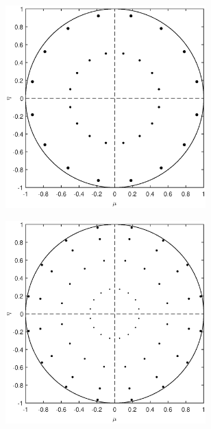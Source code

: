 \begin{figure}
\begin{subfigure}[b]{0.46\textwidth}
		\caption{}
	\end{subfigure}
	\vfill
	\begin{subfigure}[b]{0.46\textwidth}
		\centering
		\includegraphics[width=0.85\textwidth]{figures/sec_Sn/PGLC4_2_2D.eps}
		\caption{}
	\end{subfigure}
	\hfill
	\begin{subfigure}[b]{0.46\textwidth}
		\centering
		\includegraphics[width=0.85\textwidth]{figures/sec_Sn/PGLC4_4_2D.eps}
		\caption{}

\end{subfigure}
\end{figure}
